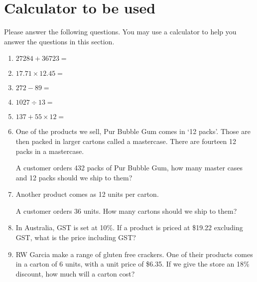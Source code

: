 \documentclass{article}
\begin{document}
\section{Calculator to be used}
Please answer the following questions. You may use a calculator to help you answer the questions in this section.
\begin{enumerate}\addtolength{\itemsep}{1\baselineskip}

\item \begin{math} 27284 + 36723 = \end{math} 
\item \begin{math} 17.71 \times 12.45 = \end{math} 
\item \begin{math} 272 - 89 = \end{math} 
\item \begin{math} 1027 \div 13 = \end{math} 
\item \begin{math} 137 + 55 \times 12 = \end{math}  
\item One of the products we sell, Pur Bubble Gum comes in `12 packs'. Those are then packed in larger cartons called a mastercase.
  There are fourteen 12 packs in a mastercase.
  

  A customer orders 432 packs of Pur Bubble Gum, how many master cases and 12 packs should we ship to them?
  
  
\item Another product comes as 12 units per carton. 

A customer orders 36 units. How many cartons should we ship to them?


\item In Australia, GST is set at 10\%. If a product is priced at \$19.22 excluding GST, what is the price including GST?


\item RW Garcia make a range of gluten free crackers. One of their products comes in a carton of 6 units, with a unit price of \$6.35.
  If we give the store an 18\% discount, how much will a carton cost?


\end{enumerate}
\end{document}
